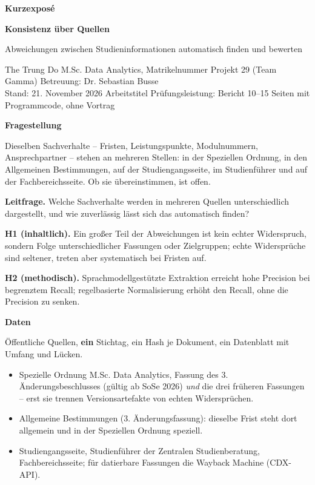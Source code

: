 \documentclass[10pt,a4paper,ngerman]{article}
\newcommand{\abschnitt}[1]{%
  \vspace{3.5pt}%
  {\small\bfseries #1}\par
  \vspace{-3pt}{\color{black!30}\rule{\linewidth}{0.4pt}}\par
  \vspace{-1pt}}
\begin{document}
{\footnotesize\bfseries Kurzexposé\par}
\vspace{1pt}
{\Large\bfseries Konsistenz über Quellen\par}
\vspace{0.5pt}
{\normalsize Abweichungen zwischen Studieninformationen automatisch finden und bewerten\par}
\vspace{2pt}
{\footnotesize
The Trung Do \textbullet{} M.Sc. Data Analytics, Matrikelnummer \matrikelnummer{} \textbullet{}
Projekt 29 (Team Gamma) \textbullet{} Betreuung: Dr. Sebastian Busse\\
Stand: 21. November 2026 \textbullet{} Arbeitstitel \textbullet{} Prüfungsleistung: Bericht
10--15 Seiten mit Programmcode, ohne Vortrag\par}

\abschnitt{Fragestellung}

Dieselben Sachverhalte -- Fristen, Leistungspunkte, Modulnummern, Ansprechpartner --
stehen an mehreren Stellen: in der Speziellen Ordnung, in den Allgemeinen Bestimmungen,
auf der Studiengangsseite, im Studienführer und auf der Fachbereichsseite. Ob sie
übereinstimmen, ist offen.

\textbf{Leitfrage.} Welche Sachverhalte werden in mehreren Quellen unterschiedlich
dargestellt, und wie zuverlässig lässt sich das automatisch finden?

\textbf{H1 (inhaltlich).} Ein großer Teil der Abweichungen ist kein echter Widerspruch,
sondern Folge unterschiedlicher Fassungen oder Zielgruppen; echte Widersprüche sind
seltener, treten aber systematisch bei Fristen auf.

\textbf{H2 (methodisch).} Sprachmodellgestützte Extraktion erreicht hohe Precision bei
begrenztem Recall; regelbasierte Normalisierung erhöht den Recall, ohne die Precision zu
senken.

\abschnitt{Daten}

Öffentliche Quellen, \textbf{ein} Stichtag, ein Hash je Dokument, ein Datenblatt mit
Umfang und Lücken.

\begin{itemize}
  \item Spezielle Ordnung M.Sc. Data Analytics, Fassung des 3. Änderungsbeschlusses
        (gültig ab SoSe 2026) \emph{und} die drei früheren Fassungen -- erst sie trennen
        Versionsartefakte von echten Widersprüchen.
  \item Allgemeine Bestimmungen (3. Änderungsfassung): dieselbe Frist steht dort allgemein
        und in der Speziellen Ordnung speziell.
  \item Studiengangsseite, Studienführer der Zentralen Studienberatung, Fachbereichsseite;
        für datierbare Fassungen die Wayback Machine (CDX-API).
\end{itemize}
\end{document}
